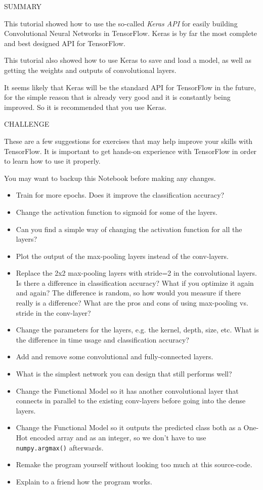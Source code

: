 \documentclass[11pt]{article}
\providecommand{\tightlist}{%
      \setlength{\itemsep}{0pt}\setlength{\parskip}{0pt}}
\begin{document}
    \hypertarget{Summary}{}
SUMMARY

This tutorial showed how to use the so-called \emph{Keras API} for
easily building Convolutional Neural Networks in TensorFlow. Keras is by
far the most complete and best designed API for TensorFlow.

This tutorial also showed how to use Keras to save and load a model, as
well as getting the weights and outputs of convolutional layers.

It seems likely that Keras will be the standard API for TensorFlow in
the future, for the simple reason that is already very good and it is
constantly being improved. So it is recommended that you use Keras.

    \hypertarget{Challenge}{}
CHALLENGE

These are a few suggestions for exercises that may help improve your
skills with TensorFlow. It is important to get hands-on experience with
TensorFlow in order to learn how to use it properly.

You may want to backup this Notebook before making any changes.

\begin{itemize}
\tightlist
\item
  Train for more epochs. Does it improve the classification accuracy?
\item
  Change the activation function to sigmoid for some of the layers.
\item
  Can you find a simple way of changing the activation function for all
  the layers?
\item
  Plot the output of the max-pooling layers instead of the conv-layers.
\item
  Replace the 2x2 max-pooling layers with stride=2 in the convolutional
  layers. Is there a difference in classification accuracy? What if you
  optimize it again and again? The difference is random, so how would
  you measure if there really is a difference? What are the pros and
  cons of using max-pooling vs. stride in the conv-layer?
\item
  Change the parameters for the layers, e.g. the kernel, depth, size,
  etc. What is the difference in time usage and classification accuracy?
\item
  Add and remove some convolutional and fully-connected layers.
\item
  What is the simplest network you can design that still performs well?
\item
  Change the Functional Model so it has another convolutional layer that
  connects in parallel to the existing conv-layers before going into the
  dense layers.
\item
  Change the Functional Model so it outputs the predicted class both as
  a One-Hot encoded array and as an integer, so we don't have to use
  \texttt{numpy.argmax()} afterwards.
\item
  Remake the program yourself without looking too much at this
  source-code.
\item
  Explain to a friend how the program works.
\end{itemize}
\end{document}

